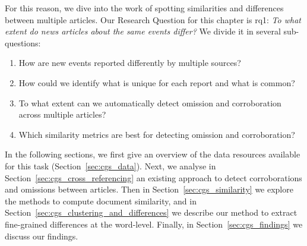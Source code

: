 For this reason, we dive into the work of spotting similarities and differences between multiple articles.
Our Research Question for this chapter is \acrshort{rq}1: \emph{To what extent do news articles about the same events differ?}
We divide it in several sub-questions: 
\begin{enumerate}[label={\textbf{RQ1.\arabic*:}},leftmargin=2cm]
    \item How are new events reported differently by multiple sources?
    \item How could we identify what is unique for each report and what is common? 
    \item To what extent can we automatically detect omission and corroboration across multiple articles?
    \item Which similarity metrics are best for detecting omission and corroboration?
\end{enumerate}




In the following sections, we first give an overview of the data resources available for this task (Section~\ref{sec:cgs_data}). Next, we
analyse in Section~\ref{sec:cgs_cross_referencing} an existing approach to detect corroborations and omissions between articles. Then in Section~\ref{sec:cgs_similarity} we explore the methods to compute document similarity, and in Section~\ref{sec:cgs_clustering_and_differences} we describe our method to extract fine-grained differences at the word-level. Finally, in Section~\ref{sec:cgs_findings} we discuss our findings.




